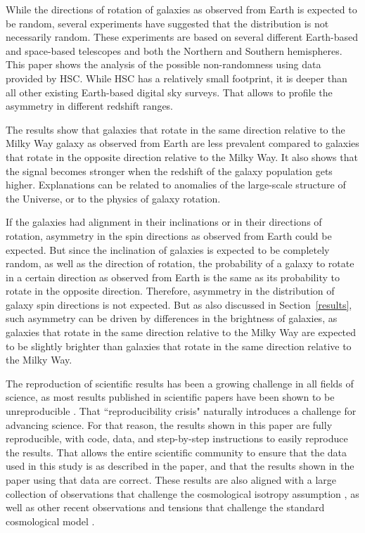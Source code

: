 \documentclass[final,5p,times,twocolumn]{article}
\begin{document}
While the directions of rotation of galaxies as observed from Earth is expected to be random, several experiments have suggested that the distribution is not necessarily random. These experiments are based on several different Earth-based and space-based telescopes and both the Northern and Southern hemispheres. This paper shows the analysis of the possible non-randomness using data provided by HSC. While HSC has a relatively small footprint, it is deeper than all other existing Earth-based digital sky surveys. That allows to profile the asymmetry in different redshift ranges. 

The results show that galaxies that rotate in the same direction relative to the Milky Way galaxy as observed from Earth are less prevalent compared to galaxies that rotate in the opposite direction relative to the Milky Way. It also shows that the signal becomes stronger when the redshift of the galaxy population gets higher. Explanations can be related to anomalies of the large-scale structure of the Universe, or to the physics of galaxy rotation.

If the galaxies had alignment in their inclinations or in their directions of rotation, asymmetry in the spin directions as observed from Earth could be expected. But since the inclination of galaxies is expected to be completely random, as well as the direction of rotation, the probability of a galaxy to rotate in a certain direction as observed from Earth is the same as its probability to rotate in the opposite direction. Therefore, asymmetry in the distribution of galaxy spin directions is not expected. But as also discussed in Section~\ref{results}, such asymmetry can be driven by differences in the brightness of galaxies, as galaxies that rotate in the same direction relative to the Milky Way are expected to be slightly brighter than galaxies that rotate in the same direction relative to the Milky Way.

The reproduction of scientific results has been a growing challenge in all fields of science, as most results published in scientific papers have been shown to be unreproducible \citep{stodden2018empirical}. That ``reproducibility crisis" naturally introduces a challenge for advancing science. For that reason, the results shown in this paper are fully reproducible, with code, data, and step-by-step instructions to easily reproduce the results. That allows the entire scientific community to ensure that the data used in this study is as described in the paper, and that the results shown in the paper using that data are correct. These results are also aligned with a large collection of observations that challenge the cosmological isotropy assumption \citep{aluri2023observable}, as well as other recent observations and tensions that challenge the standard cosmological model \citep{aluri2023observable,akarsu2024lambda,Timkov_2024,lopes2024dipolar}.
\end{document}
